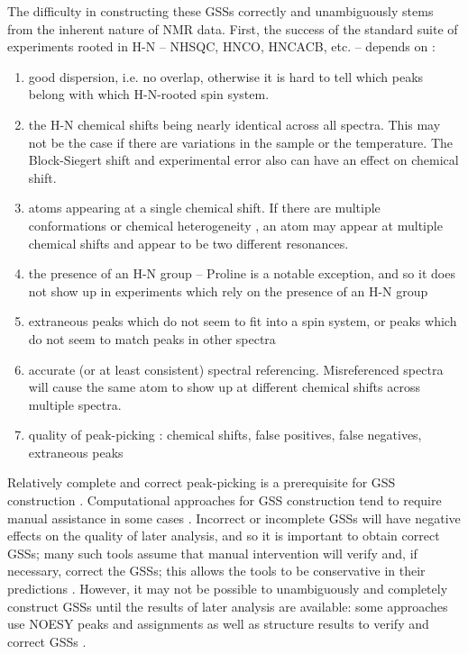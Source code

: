 The difficulty in constructing these GSSs correctly and unambiguously stems 
from the inherent nature of NMR data.  First, the success of the standard 
suite of experiments rooted in H-N -- NHSQC, HNCO, HNCACB, etc. -- depends 
on \cite{autoassign1997}: %
\begin{enumerate}
  \item good dispersion, i.e. no overlap, otherwise it is hard to tell which 
  peaks belong with which H-N-rooted spin system.
  \item the H-N chemical shifts being nearly identical across all spectra.  
  This may not be the case if there are variations in the sample or the 
  temperature.  The Block-Siegert shift and experimental error also can have 
  an effect on chemical shift.
  \item atoms appearing at a single chemical shift.  If there are multiple 
  conformations or chemical heterogeneity \cite{autoassign1997}, 
  an atom may appear at multiple chemical shifts and appear to be two 
  different resonances.
  \item the presence of an H-N group -- Proline is a notable exception, and 
  so it does not show up in experiments which rely on the presence of an H-N group
  \item extraneous peaks which do not seem to fit into a spin system, or 
  peaks which do not seem to match peaks in other spectra
  \item accurate (or at least consistent) spectral referencing.  
  Misreferenced spectra will cause the same atom to show up at different 
  chemical shifts across multiple spectra.
  \item quality of peak-picking \cite{autoassign1997}: 
  chemical shifts, false positives, false negatives, extraneous peaks
\end{enumerate}

Relatively complete and correct peak-picking is a prerequisite for GSS 
construction \cite{mars}.  Computational approaches 
for GSS construction tend to require manual assistance in some cases 
\cite{autoassign1997, mars}.  Incorrect or 
incomplete GSSs will have negative effects on the quality of later 
analysis, and so it is important to obtain correct GSSs; many such 
tools assume that manual intervention will verify and, if necessary, 
correct the GSSs; this allows the tools to be conservative in their 
predictions \cite{autoassign1997}.  However, it may not be 
possible to unambiguously and completely construct GSSs until the results 
of later analysis are available: some approaches use NOESY peaks and 
assignments as well as structure results to verify and correct GSSs 
\cite{autoassign1997}.

